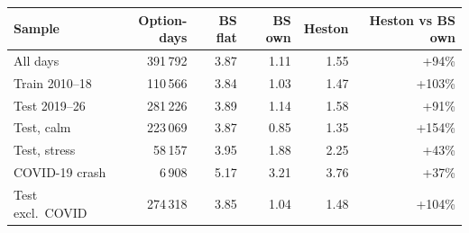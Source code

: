 \begin{tabular}{lrrrrr}
\toprule
Sample & Option-days & BS flat & BS own & Heston & Heston vs BS own \\
\midrule
All days & 391\,792 & 3.87 & 1.11 & 1.55 & +94\% \\
Train 2010--18 & 110\,566 & 3.84 & 1.03 & 1.47 & +103\% \\
Test 2019--26 & 281\,226 & 3.89 & 1.14 & 1.58 & +91\% \\
Test, calm & 223\,069 & 3.87 & 0.85 & 1.35 & +154\% \\
Test, stress & 58\,157 & 3.95 & 1.88 & 2.25 & +43\% \\
COVID-19 crash & 6\,908 & 5.17 & 3.21 & 3.76 & +37\% \\
Test excl.\ COVID & 274\,318 & 3.85 & 1.04 & 1.48 & +104\% \\
\bottomrule
\end{tabular}
